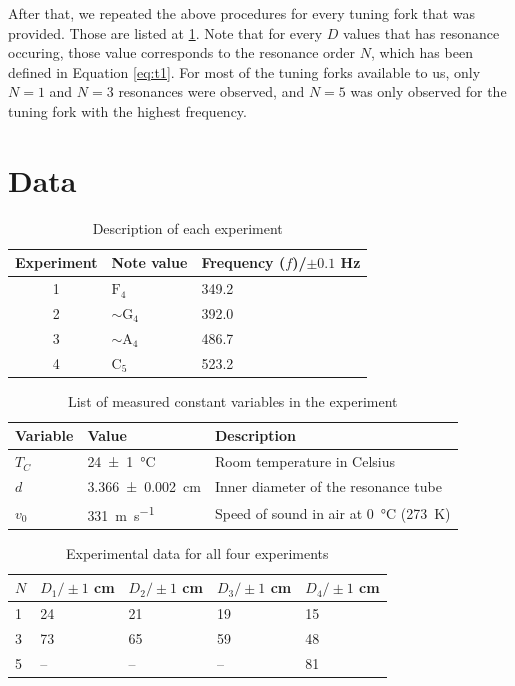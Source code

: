 \documentclass[letter]{article}
\numberwithin{equation}{section}
\numberwithin{figure}{section}
\numberwithin{table}{section}
\begin{document}
After that, we repeated the above procedures for every tuning fork that was provided. Those are listed at \ref{table:d1}. Note that for every \(D\) values that has resonance occuring, those value corresponds to the resonance order \(N\), which has been defined in Equation \eqref{eq:t1}. For most of the tuning forks available to us, only \(N = 1\) and \(N = 3\) resonances were observed, and \(N = 5\) was only observed for the tuning fork with the highest frequency.

\pagebreak
\section{Data}
\begin{table}[!h]
  \setlength\extrarowheight{2.5pt}
  \centering
  \begin{tabular}{|c|l|l|}
    \hline
    Experiment      & Note value            & Frequency (\(f\))/\(\pm 0.1\) \si{Hz} \\
    \hline
    1               & \(\mathrm{F}_4\)      & 349.2 \\
    2               & \(\sim \mathrm{G}_4\) & 392.0 \\
    3               & \(\sim \mathrm{A}_4\) & 486.7 \\
    4               & \(\mathrm{C}_5\)      & 523.2 \\
    \hline
  \end{tabular}
  \caption{Description of each experiment}
  \label{table:d1}
\end{table}

\begin{table}[!h]
  \setlength\extrarowheight{2.5pt}
  \centering
  \begin{tabular}{|l|l|l|}
    \hline
    Variable  & Value                       & Description\\
    \hline
    \(T_C\)   & \SI{24(1)}{\celsius}        & {Room temperature in Celsius}\\
    \(d\)     & \SI{3.366(2)}{\centi\metre} & {Inner diameter of the resonance tube}\\
    \(v_0\)   & \SI{331}{\metre\per\second} & {Speed of sound in air at \SI{0}{\celsius} (\SI{273}{\kelvin})}\\
    \hline
  \end{tabular}
  \caption{List of measured constant variables in the experiment}
  \label{table:d2}
\end{table}

\begin{table}[!h]
  \setlength\extrarowheight{2.5pt}
  \centering
  \begin{tabular}{|l|l|l|l|l|}
    \hline
    \(N\) & \(D_1 / \pm 1\) \si{cm} & \(D_2 / \pm 1\) \si{cm} & \(D_3 / \pm 1\) \si{cm} & \(D_4 / \pm 1\) \si{cm} \\
    \hline
    1  & 24  & 21  & 19  & 15 \\
    3  & 73  & 65  & 59  & 48 \\
    5  & --  & --  & --  & 81 \\
    \hline
  \end{tabular}
  \caption{Experimental data for all four experiments}
  \label{table:d3}
\end{table}
\end{document}
